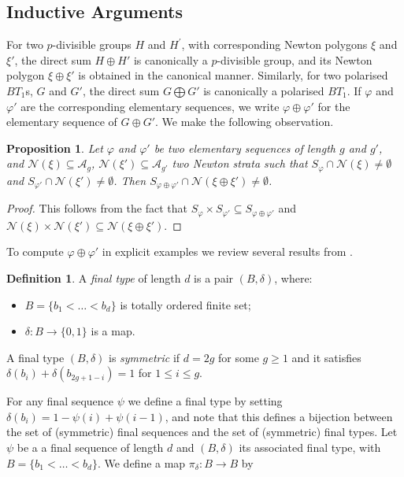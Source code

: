 \documentclass[11pt,table]{amsart}
\numberwithin{equation}{section}
\newtheorem{prop}[thm]{Proposition}
\theoremstyle{definition}
\newtheorem{defn}[thm]{Definition}
\theoremstyle{remark}
\theoremstyle{remark}
\begin{document}
\subsection{Inductive Arguments} \label{inducsec}
For two $p$-divisible groups $H$ and $H^{'}$, with corresponding Newton polygons $\xi$ and $\xi'$, the direct sum $H \oplus H'$ is canonically a $p$-divisible group, and its Newton polygon $\xi \oplus \xi'$ is obtained in the canonical manner. Similarly, for two polarised $BT_1$s, $G$ and $G'$, the direct sum $G \bigoplus G'$ is canonically a polarised $BT_1$. If $\varphi$ and $\varphi'$ are the corresponding elementary sequences, we write  $\varphi \oplus \varphi'$  for the elementary sequence of $G \oplus G'$. We make the following observation. 
\begin{prop} \label{inductiveprop}
  Let $\varphi$ and $\varphi'$ be two elementary sequences of length $g$ and $g'$, and $\mathcal{N}(\xi) \subseteq \mathcal{A}_{g}$, $ \mathcal{N}(\xi') \subseteq \mathcal{A}_{g'}$ two Newton strata such that $S_{\varphi} \cap \mathcal{N}(\xi) \neq \emptyset$ and $S_{\varphi'} \cap \mathcal{N}( \xi') \neq \emptyset$. Then $S_{\varphi \oplus \varphi'} \cap \mathcal{N}( \xi \oplus \xi')  \ne \emptyset$.
   \end{prop}
\begin{proof}
 This follows from the fact that $S_{\varphi} \times S_{\varphi'} \subseteq S_{\varphi \oplus \varphi'}$  and $\mathcal{N}(\xi) \times \mathcal{N}(\xi') \subseteq \mathcal{N}( \xi \oplus \xi')$.   
\end{proof}

To compute $ \varphi \oplus \varphi'$ in explicit examples we review several results from \cite[Section 4]{harashita2009configuration}. 
\begin{defn}
  A \textit{final type} of length $d$ is a pair $(B, \delta)$, where:
  \begin{itemize}
      \item $B = \{ b_{1} < \ldots < b_{d} \}$ is totally ordered finite set;
      \item $ \delta: B \rightarrow \{ 0, 1 \}$ is a map.
      \end{itemize}
 A final type $(B, \delta)$ is \textit{symmetric} if $ d= 2g$ for some $g \ge 1$ and it satisfies $\delta(b_{i}) + \delta(b_{2g +1 - i}) =1$ for $1 \le i \le g $. 
\end{defn}
For any final sequence $\psi$ we define a final type by setting $\delta(b_{i}) = 1 - \psi(i) + \psi( i-1)$, and note that this defines a bijection between the set of (symmetric) final sequences and the set of (symmetric) final types.  Let $\psi$ be a a final sequence of length $d$ and $(B, \delta)$ its associated final type, with $B = \{ b_{1} < \ldots < b_{d} \}$. We define a map $\pi_{\delta} : B \rightarrow B$ by 
\end{document}
